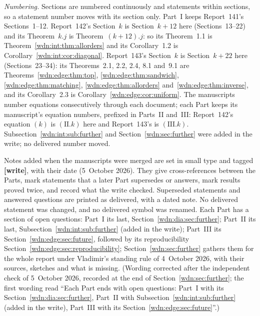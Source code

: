 \documentclass[11pt,letterpaper]{article}
\theoremstyle{remark}\newtheorem{remark}[theorem]{Remark}
\begin{document}
\emph{Numbering.} Sections are numbered continuously and statements within sections, so a statement number moves with its section only. Part~I keeps Report~141's Sections~1--12. Report~142's Section~$k$ is Section~$k+12$ here (Sections~13--22) and its Theorem~$k.j$ is Theorem~$(k+12).j$: so its Theorem~1.1 is Theorem~\ref{wdn:int:thm:allorders} and its Corollary~1.2 is Corollary~\ref{wdn:int:cor:diagonal}. Report~143's Section~$k$ is Section~$k+22$ here (Sections~23--34): its Theorems~2.1, 2.2, 2.4, 8.1 and~9.1 are Theorems~\ref{wdn:edge:thm:top}, \ref{wdn:edge:thm:sandwich}, \ref{wdn:edge:thm:matching}, \ref{wdn:edge:thm:allorders} and~\ref{wdn:edge:thm:inverse}, and its Corollary~2.3 is Corollary~\ref{wdn:edge:cor:uniform}. The manuscripts number equations consecutively through each document; each Part keeps its manuscript's equation numbers, prefixed in Parts~II and~III: Report~142's equation $(k)$ is $(\mathrm{II}.k)$ here and Report~143's is $(\mathrm{III}.k)$. Subsection~\ref{wdn:int:sub:further} and Section~\ref{wdn:sec:further} were added in the write; no delivered number moved.

Notes added when the manuscripts were merged are set in small type and tagged \textbf{[write]}, with their date (5~October 2026). They give cross-references between the Parts, mark statements that a later Part supersedes or answers, mark results proved twice, and record what the write checked. Superseded statements and answered questions are printed as delivered, with a dated note. No delivered statement was changed, and no delivered symbol was renamed. Each Part has a section of open questions: Part~I its last, Section~\ref{wdn:dia:sec:further}; Part~II its last, Subsection~\ref{wdn:int:sub:further} (added in the write); Part~III its Section~\ref{wdn:edge:sec:future}, followed by its reproducibility Section~\ref{wdn:edge:sec:reproducibility}; Section~\ref{wdn:sec:further} gathers them for the whole report under Vladimir's standing rule of 4~October 2026, with their sources, sketches and what is missing. \textup{(Wording corrected after the independent check of 5~October 2026, recorded at the end of Section~\ref{wdn:sec:further}; the first wording read ``Each Part ends with open questions: Part~I with its Section~\ref{wdn:dia:sec:further}, Part~II with Subsection~\ref{wdn:int:sub:further} (added in the write), Part~III with its Section~\ref{wdn:edge:sec:future}''.)}
\end{document}
